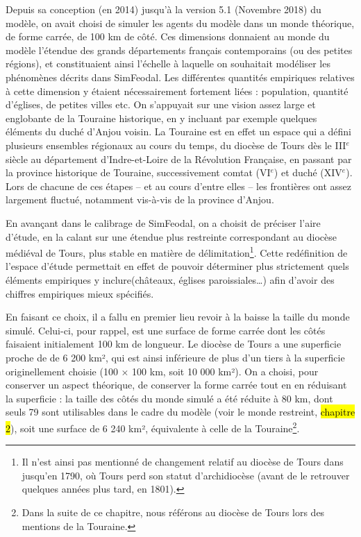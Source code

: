 Depuis sa conception (en 2014) jusqu'à la version 5.1 (Novembre 2018) du modèle, on avait choisi de simuler les agents du modèle dans un monde théorique, de forme carrée, de 100 km de côté.
Ces dimensions donnaient au monde du modèle l'étendue des grands départements français contemporains (ou des petites régions), et constituaient ainsi l'échelle à laquelle on souhaitait modéliser les phénomènes décrits dans SimFeodal.
Les différentes quantités empiriques relatives à cette dimension y étaient nécessairement fortement liées : population, quantité d'églises, de petites villes etc.
On s'appuyait sur une vision assez large et englobante de la Touraine historique, en y incluant par exemple quelques éléments du duché d'Anjou voisin.
La Touraine est en effet un espace qui a défini plusieurs ensembles régionaux au cours du temps, du diocèse de Tours dès le III$^e$ siècle au département d'Indre-et-Loire de la Révolution Française, en passant par la province historique de Touraine, successivement comtat (VI$^e$) et duché (XIV$^e$).
Lors de chacune de ces étapes -- et au cours d'entre elles -- les frontières ont assez largement fluctué, notamment vis-à-vis de la province d'Anjou.

En avançant dans le calibrage de SimFeodal, on a choisit de préciser l'aire d'étude, en la calant sur une étendue plus restreinte correspondant au diocèse médiéval de Tours, plus stable en matière de délimitation\footnote{
	Il n'est ainsi pas mentionné de changement relatif au diocèse de Tours dans \textcite[309--326]{mirot1947manuel} jusqu'en 1790, où Tours perd son statut d'archidiocèse (avant de le retrouver quelques années plus tard, en 1801).
}.
Cette redéfinition de l'espace d'étude permettait en effet de pouvoir déterminer plus strictement quels éléments empiriques y inclure(châteaux, églises paroissiales\ldots) afin d'avoir des chiffres empiriques mieux spécifiés.

En faisant ce choix, il a fallu en premier lieu revoir à la baisse la taille du monde simulé.
Celui-ci, pour rappel, est une surface de forme carrée dont les côtés faisaient initialement 100 km de longueur.
Le diocèse de Tours a une superficie proche de de 6 200 km², qui est ainsi inférieure de plus d'un tiers à la superficie originellement choisie (100 $\times$ 100 km, soit 10 000 km²).
On a choisi, pour conserver un aspect théorique, de conserver la forme carrée tout en en réduisant la superficie : la taille des côtés du monde simulé a été réduite à 80 km, dont seuls 79 sont utilisables dans le cadre du modèle (voir le monde restreint, \hl{chapitre 2}), soit une surface de 6 240 km², équivalente à celle de la Touraine\footnote{
	Dans la suite de ce chapitre, nous référons au diocèse de Tours lors des mentions de la Touraine.
}.

